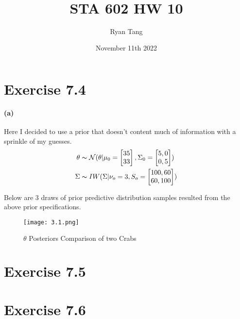 \documentclass[11pt, letterpaper]{article}
\author{Ryan Tang}
\title{STA 602 HW 10}
\date{November 11th 2022}
\begin{document}
\maketitle

\section{Exercise 7.4}
\paragraph{(a)}
Here I decided to use a prior that doesn't content much of information with a sprinkle of my guesses.
\begin{align*}
    \theta &\thicksim \mathcal{N}(\theta|
        \mu_0=\begin{bmatrix}35\\33\end{bmatrix},
        \Sigma_0=\begin{bmatrix}5,0\\0,5\end{bmatrix}
    ) \\
    \Sigma &\thicksim IW(\Sigma|\nu_o = 3, S_o =\begin{bmatrix}100,60\\60,100\end{bmatrix})
\end{align*}

Below are 3 draws of prior predictive distribution samples resulted from the above prior specifications.
\begin{figure*}[!h]
  \centering
  \texttt{[image: 3.1.png]}
  \captionsetup{justification=centering}
  \caption{$\theta$ Posteriors Comparison of two Crabs}
\end{figure*}


\section{Exercise 7.5}
\section{Exercise 7.6}
\end{document}
